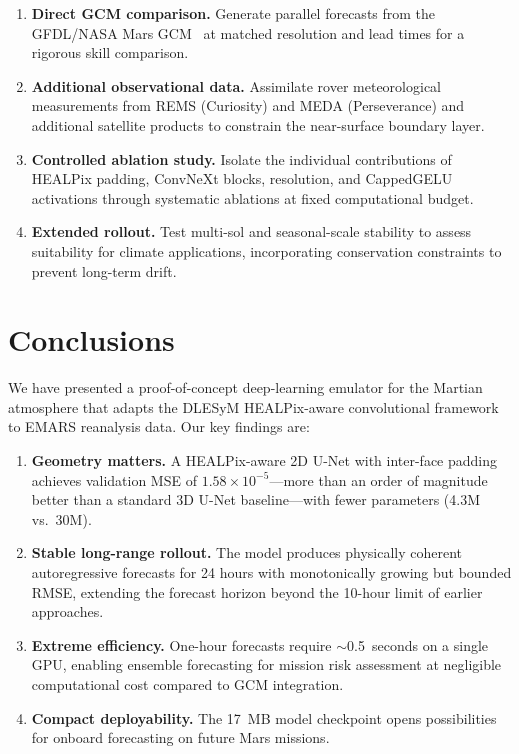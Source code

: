 \documentclass[11pt, a4paper, twocolumn]{article}
\begin{document}
\begin{enumerate}
    \item \textbf{Direct GCM comparison.} Generate parallel forecasts from the GFDL/NASA Mars GCM~\cite{haberle2019} at matched resolution and lead times for a rigorous skill comparison.

    \item \textbf{Additional observational data.} Assimilate rover meteorological measurements from REMS (Curiosity) and MEDA (Perseverance) and additional satellite products to constrain the near-surface boundary layer.

    \item \textbf{Controlled ablation study.} Isolate the individual contributions of HEALPix padding, ConvNeXt blocks, resolution, and CappedGELU activations through systematic ablations at fixed computational budget.

    \item \textbf{Extended rollout.} Test multi-sol and seasonal-scale stability to assess suitability for climate applications, incorporating conservation constraints to prevent long-term drift.
\end{enumerate}

\section{Conclusions}

We have presented a proof-of-concept deep-learning emulator for the Martian atmosphere that adapts the DLESyM HEALPix-aware convolutional framework to EMARS reanalysis data. Our key findings are:

\begin{enumerate}
    \item \textbf{Geometry matters.} A HEALPix-aware 2D U-Net with inter-face padding achieves validation MSE of $1.58 \times 10^{-5}$---more than an order of magnitude better than a standard 3D U-Net baseline---with fewer parameters (4.3M vs.\ 30M).

    \item \textbf{Stable long-range rollout.} The model produces physically coherent autoregressive forecasts for 24 hours with monotonically growing but bounded RMSE, extending the forecast horizon beyond the 10-hour limit of earlier approaches.

    \item \textbf{Extreme efficiency.} One-hour forecasts require ${\sim}$0.5~seconds on a single GPU, enabling ensemble forecasting for mission risk assessment at negligible computational cost compared to GCM integration.

    \item \textbf{Compact deployability.} The 17~MB model checkpoint opens possibilities for onboard forecasting on future Mars missions.
\end{enumerate}
\end{document}
